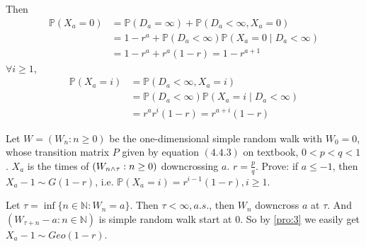 \documentclass[../main]{subfiles}
\begin{document}
\begin{solution}
\begin{enumerate}
      Then \[
        \begin{aligned}
          \mathbb{P}(X_a=0) & =\mathbb{P}(D_a=\infty) + \mathbb{P}(D_a < \infty, X_a=0)            \\
                            & =1-r^a + \mathbb{P}(D_a < \infty)\mathbb{P}(X_a=0 \mid D_a < \infty) \\
                            & =1-r^a + r^a(1-r)=1-r^{a + 1}
        \end{aligned}
      \]
      \(\forall i \geq 1\),
      \[
        \begin{aligned}
          \mathbb{P}(X_a=i) & =\mathbb{P}(D_a< \infty,X_a=i)                                    \\
                            & =    \mathbb{P}(D_a< \infty)\mathbb{P}(X_a = i \mid D_a < \infty) \\
                            & =r^ar^i(1-r)=r^{a + i}(1-r)
        \end{aligned}
      \]
  \end{enumerate}
\end{solution}
\begin{problem}\label{pro:4}
  Let \(W=(W_n:n \geq 0)\) be the one-dimensional simple random walk with \(W_0=0\),
  whose transition matrix \(P\) given by equation \((4.4.3)\)
  on textbook, \(0< p<q<1\).
  \(X_a\) is the times of \((W_{n \wedge \tau}:n \geq 0)\) downcrossing \(a\).
  \(r=\frac{p}{q}\).
  Prove: if \(a \leq -1\), then \(X_a-1 \sim G(1-r)\), i.e. \(\mathbb{P}(X_a=i)=r^{i-1}(1-r),i \geq 1\).
\end{problem}
\begin{solution}
  Let \(\tau=\inf \{n \in \mathbb{N}:W_n=a\}\). Then \(\tau < \infty,a. s.\), then \(W_n\) downcross \(a\) at \(\tau\).
  And \((W_{\tau+n}-a:n \in \mathbb{N})\) is simple random walk start at \(0\).
  So by \ref{pro:3} we easily get \(X_a -1\sim Geo(1-r)\).
\end{solution}
\end{document}
